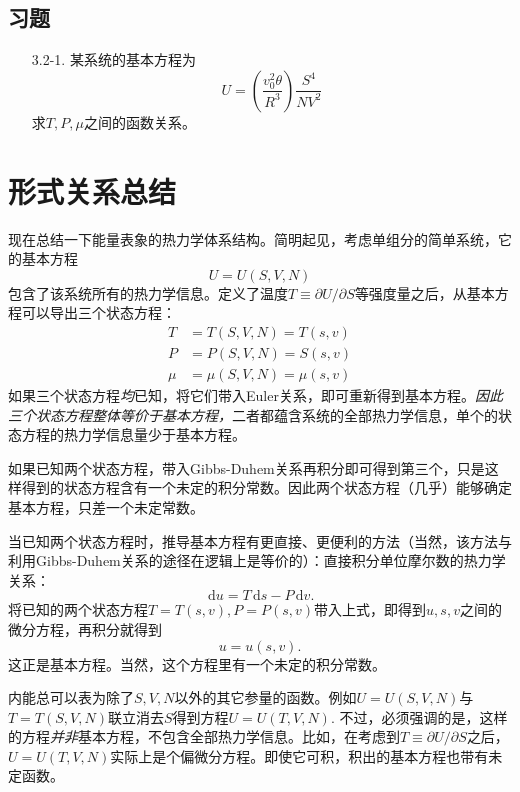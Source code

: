 \subsection*{习题}
\begin{itemize}
\item[3.2-1.] 某系统的基本方程为
\[
	U = \left( \frac{v_0^2 \theta}{R^3} \right) \frac{S^4}{NV^2}
\]
求$T, P, \mu$之间的函数关系。
\end{itemize}

\section{形式关系总结}
\label{sec3.3}
现在总结一下能量表象的热力学体系结构。简明起见，考虑单组分的简单系统，它的基本方程
\begin{equation}
\label{equ3.19}
    U = U(S, V, N)
\end{equation}
包含了该系统所有的热力学信息。定义了温度$T \equiv \partial U / \partial S$等强度量之后，从基本方程可以导出三个状态方程：
\begin{align}
    T &= T(S, V, N) = T(s, v) \label{equ3.20} \\
    P &= P(S, V, N) = S(s, v) \label{equ3.21} \\
    \mu &= \mu(S, V, N) = \mu(s, v) \label{equ3.22}
\end{align}
如果三个状态方程{\it 均}已知，将它们带入Euler关系，即可重新得到基本方程。{\it 因此三个状态方程整体等价于基本方程，}二者都蕴含系统的全部热力学信息，单个的状态方程的热力学信息量少于基本方程。

如果已知两个状态方程，带入Gibbs-Duhem关系再积分即可得到第三个，只是这样得到的状态方程含有一个未定的积分常数。因此两个状态方程（几乎）能够确定基本方程，只差一个未定常数。

当已知两个状态方程时，推导基本方程有更直接、更便利的方法（当然，该方法与利用Gibbs-Duhem关系的途径在逻辑上是等价的）：直接积分单位摩尔数的热力学关系：
\begin{equation}
    \,\mathrm du = T\,\mathrm ds - P\,\mathrm dv.
\label{equ3.23}
\end{equation}
将已知的两个状态方程$T = T(s, v), P = P(s, v)$带入上式，即得到$u, s, v$之间的微分方程，再积分就得到
\begin{equation}
    u = u(s, v).
\label{equ3.24}
\end{equation}
这正是基本方程。当然，这个方程里有一个未定的积分常数。

内能总可以表为除了$S, V, N$以外的其它参量的函数。例如$U = U(S, V, N)$与$T = T(S, V, N)$联立消去$S$得到方程$U = U(T, V, N)$. 不过，必须强调的是，这样的方程{\it 并非}基本方程，不包含全部热力学信息。比如，在考虑到$T \equiv \partial U / \partial S$之后，$U = U(T, V, N)$实际上是个偏微分方程。即使它可积，积出的基本方程也带有未定函数。

